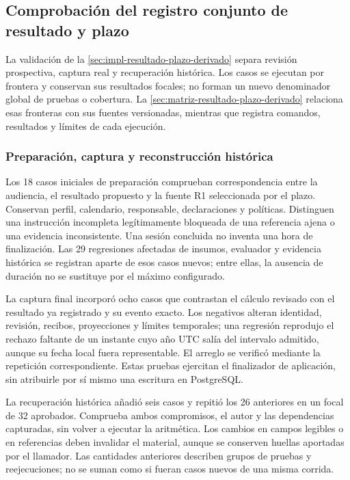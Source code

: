 \subsection{Comprobación del registro conjunto de resultado y plazo}\label{sec:pruebas-resultado-plazo-derivado}

La validación de la \cref{sec:impl-resultado-plazo-derivado} separa revisión prospectiva, captura real y recuperación histórica. Los casos se ejecutan por frontera y conservan sus resultados focales; no forman un nuevo denominador global de pruebas o cobertura. La \cref{sec:matriz-resultado-plazo-derivado} relaciona esas fronteras con sus fuentes versionadas, mientras que  registra comandos, resultados y límites de cada ejecución.

\subsubsection{Preparación, captura y reconstrucción histórica}

Los 18 casos iniciales de preparación comprueban correspondencia entre la audiencia, el resultado propuesto y la fuente R1 seleccionada por el plazo. Conservan perfil, calendario, responsable, declaraciones y políticas. Distinguen una instrucción incompleta legítimamente bloqueada de una referencia ajena o una evidencia inconsistente. Una sesión concluida no inventa una hora de finalización. Las 29 regresiones afectadas de insumos, evaluador y evidencia histórica se registran aparte de esos casos nuevos; entre ellas, la ausencia de duración no se sustituye por el máximo configurado.

La captura final incorporó ocho casos que contrastan el cálculo revisado con el resultado ya registrado y su evento exacto. Los negativos alteran identidad, revisión, recibos, proyecciones y límites temporales; una regresión reprodujo el rechazo faltante de un instante cuyo año UTC salía del intervalo admitido, aunque su fecha local fuera representable. El arreglo se verificó mediante la repetición correspondiente. Estas pruebas ejercitan el finalizador de aplicación, sin atribuirle por sí mismo una escritura en PostgreSQL.

La recuperación histórica añadió seis casos y repitió los 26 anteriores en un focal de 32 aprobados. Comprueba ambos compromisos, el autor y las dependencias capturadas, sin volver a ejecutar la aritmética. Los cambios en campos legibles o en referencias deben invalidar el material, aunque se conserven huellas aportadas por el llamador. Las cantidades anteriores describen grupos de pruebas y reejecuciones; no se suman como si fueran casos nuevos de una misma corrida.

